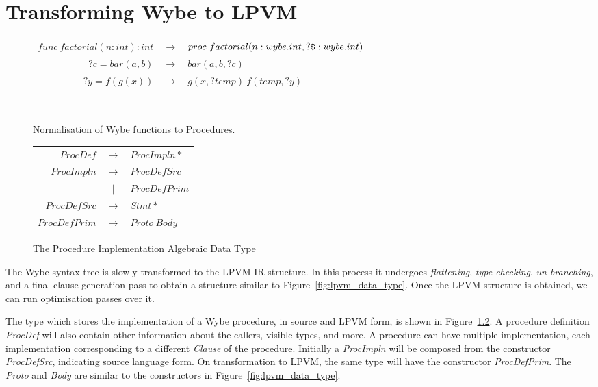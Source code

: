 \chapter{Transforming Wybe to LPVM}
\label{chap:wybe_to_lpvm}

\begin{figure}
  \centering
  \begin{tabular}{r c l}

    \( func\ factorial(n:int):int \) & \(\rightarrow \) & 
                                                          \( proc\ factorial(n:wybe.int, ?\verb+$+:wybe.int) \) \\
    \( ?c = bar(a, b) \) & \(\rightarrow\) & \( bar(a, b, ?c) \) \\
    \( ?y = f(g(x)) \) & \(\rightarrow\) & \( g(x, ?temp)\ f(temp, ?y) \) \\


  \end{tabular}
  \\
  \caption{Normalisation of Wybe functions to Procedures.}
  \label{fig:wybe_convert_to_proc}
\end{figure}



\begin{figure}
  \centering
  \begin{tabular}{r c l}
    \( ProcDef \)     & \( \rightarrow \) & \( ProcImpln* \)   \\
    \( ProcImpln \)   & \( \rightarrow \) & \( ProcDefSrc \)   \\
                      & \( \rvert \)        & \( ProcDefPrim \)  \\
    \( ProcDefSrc \)  & \( \rightarrow \) & \( Stmt* \)        \\
    \( ProcDefPrim \) & \( \rightarrow \) & \( Proto\ Body \)  \\
  \end{tabular}
  \caption{The Procedure Implementation Algebraic Data Type}
  \label{fig:proc_impln}
\end{figure}



The Wybe syntax tree is slowly transformed to the LPVM IR structure. In this
process it undergoes \textit{flattening}, \textit{type checking},
\textit{un-branching}, and a final clause generation pass to obtain a structure
similar to Figure~\ref{fig:lpvm_data_type}. Once the LPVM structure is
obtained, we can run optimisation passes over it.

The type which stores the implementation of a Wybe procedure, in source and
LPVM form, is shown in Figure~\ref{fig:proc_impln}. A procedure definition
\textit{ProcDef} will also contain other information about the callers, visible
types, and more. A procedure can have multiple implementation, each
implementation corresponding to a different \textit{Clause} of the
procedure. Initially a \textit{ProcImpln} will be composed from the constructor
\textit{ProcDefSrc}, indicating source language form. On transformation to
LPVM, the same type will have the constructor \textit{ProcDefPrim}. The
\textit{Proto} and \textit{Body} are similar to the constructors in
Figure~\ref{fig:lpvm_data_type}.


